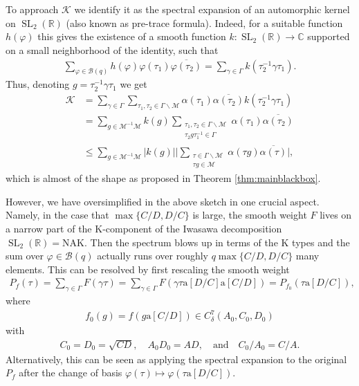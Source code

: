 \documentclass[12pt]{amsart}
\theoremstyle{definition}
\theoremstyle{remark}
\numberwithin{equation}{section}
\newcommand{\B}{\mathcal{B}}
\newcommand{\C}{{\mathbb C}}
\newcommand{\R}{{\mathbb R}}
\newcommand{\1}{{\mathbf 1}}
\newcommand{\SL}{\operatorname{SL}_2}
\renewcommand{\a}{\mathrm{a}}
\begin{document}
To approach $\mathcal{K}$ we identify it as the spectral expansion of an automorphic kernel on $\SL(\R)$ (also known as pre-trace formula). Indeed, for a suitable function $h(\varphi)$ this gives the existence of a smooth function $k:\SL(\R) \to \C$ supported on a small neighborhood of the identity, such that
\begin{align*}
   \sum_{\varphi \in \B(q)} h(\varphi) \varphi(\tau_1) \overline{\varphi(\tau_2) } = \sum_{\gamma \in \Gamma} k(\tau_2^{-1} \gamma \tau_1).
\end{align*}
Thus, denoting $g=\tau_2^{-1} \gamma \tau_1$ we get
\begin{align*}
    \mathcal{K} &=  \sum_{\gamma \in \Gamma} \sum_{\tau_1,\tau_2 \in  \Gamma \backslash \mathcal{M} } \alpha(\tau_1 ) \overline{\alpha(\tau_2)}  k(\tau_2^{-1} \gamma \tau_1)  \\
   \nonumber  &= \sum_{g \in \mathcal{M}^{-1} \mathcal{M}}  k(g)\sum_{\substack{\tau_1,\tau_2 \in  \Gamma \backslash \mathcal{M}  \\ \tau_2 g \tau_1^{-1} \in \Gamma }} \alpha(\tau_1 ) \overline{\alpha(\tau_2)}   \\
   \nonumber  & \leq  \sum_{g \in \mathcal{M}^{-1} \mathcal{M}}  |k(g)| \bigg|\sum_{\substack{\tau \in \Gamma \backslash \mathcal{M} \\ \tau g \in \mathcal{M} }} \alpha(\tau g ) \overline{\alpha(\tau)} \bigg|,
\end{align*}
which is almost of the shape as proposed in Theorem \ref{thm:mainblackbox}. 

However, we have oversimplified in the above sketch in one crucial aspect. Namely, in the case that $\max\{ C/D,D/C\}$ is large, the smooth weight $F$  lives on a narrow part of the $\mathrm{K}$-component of the Iwasawa decomposition $\SL(\R)= \mathrm{N}\mathrm{A}\mathrm{K}$. Then the spectrum blows up in terms of the $\mathrm{K}$ types and the sum over $\varphi \in \B(q)$ actually runs over roughly $q \max\{ C/D,D/C\}$ many elements. This can be resolved by first rescaling the smooth weight 
\begin{align*}
    P_f(\tau) = \sum_{\gamma \in \Gamma} F(\gamma \tau) =   \sum_{\gamma \in \Gamma} F(\gamma \tau \a[D/C] \a [C/D]  ) =   P_{f_0}(\tau \a[D/C]),
\end{align*}
where 
\begin{align*}
    f_0(g) = f(g \a [C/D])  \in C_\delta^{7}(A_0,C_0,D_0)
\end{align*}
with
\begin{align*}
    C_0 = D_0 = \sqrt{CD}, \quad A_0D_0=AD, \quad \text{and} \quad C_0/A_0 = C/A.
\end{align*}
Alternatively, this can be seen as applying the spectral expansion to the original $P_f$ after the change of basis $\varphi(\tau) \mapsto \varphi(\tau \a[D/C])$. 
\end{document}
